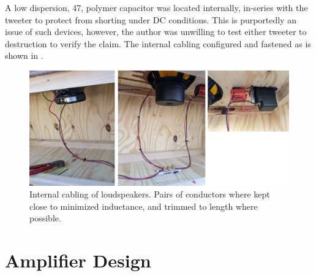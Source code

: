 \documentclass{StdTemplate} %
\begin{document}
%
A low dispersion, \SI{47}{\uF}, polymer capacitor was located internally, in-series with the tweeter to protect from shorting under DC conditions. This is purportedly an issue of such devices, however, the author was unwilling to test either tweeter to destruction to verify the claim. The internal cabling configured and fastened as is shown in .\par
%
\begin{figure}[h!]
\centering
\includegraphics[width = 7 in]{Images/sp_int_collage.jpg}
\caption{Internal cabling of loudspeakers. Pairs of conductors where kept close to minimized inductance, and trimmed to length where possible.}
\label{fig:sp_cabling}
\end{figure}
%
\section{Amplifier Design}
%
\end{document}

